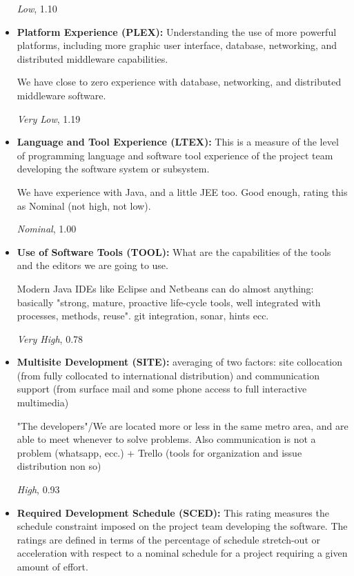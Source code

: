\documentclass[english]{article}
\begin{document}
\begin{itemize}
\textit{Low}, 1.10


\item \textbf{Platform Experience (PLEX):} Understanding the use of more powerful platforms, including more graphic user interface, database, networking, and distributed middleware capabilities.

We have close to zero experience with database, networking, and distributed middleware software.

\textit{Very Low}, 1.19


\item \textbf{Language and Tool Experience (LTEX):} This is a measure of the level of programming language and software tool experience of the project team developing the software system or subsystem.

We have experience with Java, and a little JEE too. Good enough, rating this as Nominal (not high, not low).

\textit{Nominal}, 1.00


\item \textbf{Use of Software Tools (TOOL):} What are the capabilities of the tools and the editors we are going to use.

Modern Java IDEs like Eclipse and Netbeans can do almost anything: basically "strong, mature, proactive life-cycle tools, well integrated with processes, methods, reuse". 
git integration, sonar, hints ecc.

\textit{Very High}, 0.78


\item \textbf{Multisite Development (SITE):} averaging of two factors: site collocation (from fully collocated to international distribution) and communication support (from surface mail and some phone access to full interactive multimedia)

"The developers"/We are located more or less in the same metro area, and are able to meet whenever to solve problems.
Also communication is not a problem (whatsapp, ecc.)
+ Trello (tools for organization and issue distribution non so)

\textit{High}, 0.93

\item \textbf{Required Development Schedule (SCED):} This rating measures the schedule constraint imposed on the project team developing the software. The ratings are defined in terms of the percentage of schedule stretch-out or acceleration with respect to a nominal schedule for a project requiring a given amount of effort.


\end{itemize}
\end{document}
